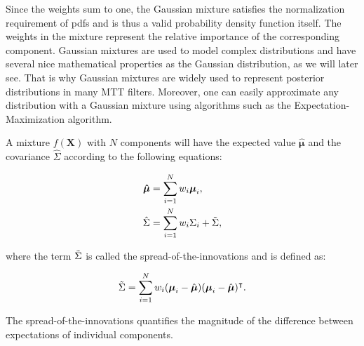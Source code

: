 Since the weights sum to one, the Gaussian mixture satisfies the normalization requirement of pdfs and is thus a valid probability density function itself. The weights in the mixture represent the relative importance of the corresponding component. Gaussian mixtures are used to model complex distributions and have several nice mathematical properties as the Gaussian distribution, as we will later see. That is why Gaussian mixtures are widely used to represent posterior distributions in many MTT filters. Moreover, one can easily approximate any distribution with a Gaussian mixture using algorithms such as the Expectation-Maximization algorithm.

A mixture $f(\mathbf{X})$ with $N$ components will have the expected value $\boldsymbol{\hat{\mu}}$ and the covariance $\hat{\Sigma}$ according to the following equations:

\begin{align}
    \boldsymbol{\hat{\mu}} &= \sum_{i=1}^N w_i \boldsymbol{\mu}_i, \\
    \hat{\Sigma} &= \sum_{i=1}^N w_i \Sigma_i + \Tilde{\Sigma},
\end{align}

where the term $\Tilde{\Sigma}$ is called the spread-of-the-innovations and is defined as:

\begin{equation}
    \Tilde{\Sigma}= \sum_{i=1}^N
        w_i (\boldsymbol{\mu}_i - \hat{\boldsymbol{\mu}})
        (\boldsymbol{\mu}_i - \hat{\boldsymbol{\mu}})^\intercal.
\end{equation}

The spread-of-the-innovations quantifies the magnitude of the difference between expectations of individual components.
